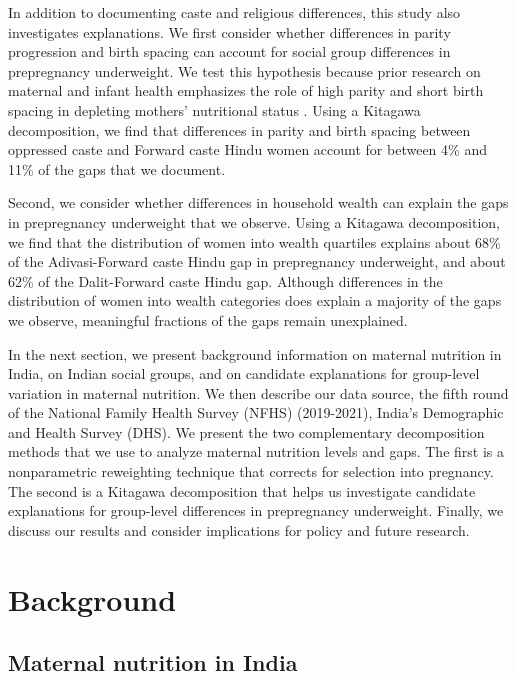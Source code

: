 \documentclass[12pt]{article}
\begin{document}
In addition to documenting caste and religious differences, this study also investigates explanations. We first consider whether differences in parity progression and birth spacing can account for social group differences in prepregnancy underweight.  We test this hypothesis because prior research on maternal and infant health emphasizes the role of high parity and short birth spacing in depleting mothers' nutritional status \citep{winkvist1992new, bauserman2020relationship}.  Using a Kitagawa decomposition, we find that differences in parity and birth spacing between oppressed caste and Forward caste Hindu women account for between 4\% and 11\% of the gaps that we document.  

Second, we consider whether differences in household wealth can explain the gaps in prepregnancy underweight that we observe.  Using a Kitagawa decomposition, we find that the distribution of women into wealth quartiles explains about 68\% of the Adivasi-Forward caste Hindu gap in prepregnancy underweight, and about 62\% of the Dalit-Forward caste Hindu gap. Although differences in the distribution of women into wealth categories does explain a majority of the gaps we observe, meaningful fractions of the gaps remain unexplained.

In the next section, we present background information on maternal nutrition in India, on Indian social groups, and on candidate explanations for group-level variation in maternal nutrition.  We then describe our data source, the fifth round of the National Family Health Survey (NFHS) (2019-2021), India's Demographic and Health Survey (DHS).  We present the two complementary decomposition methods that we use to analyze maternal nutrition levels and gaps.  The first is a nonparametric reweighting technique that corrects for selection into pregnancy.  The second is a Kitagawa decomposition that helps us investigate candidate explanations for group-level differences in prepregnancy underweight.  Finally, we discuss our results and consider implications for policy and future research.


\section{Background}

\subsection{Maternal nutrition in India}
\end{document}
